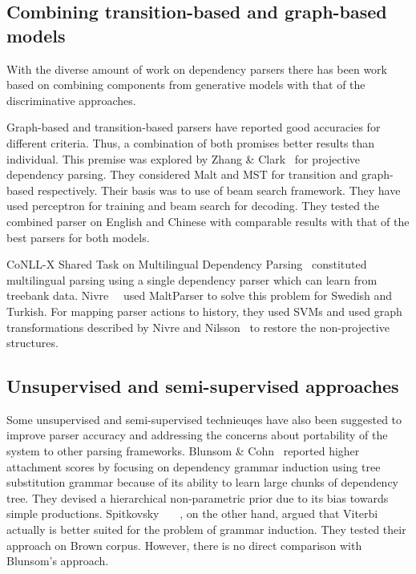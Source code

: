 \subsection{Combining transition-based and graph-based models}


With the diverse amount of work on dependency parsers there has been work based on combining components from generative models with that of the discriminative approaches.

Graph-based and transition-based parsers have reported good accuracies for different criteria. Thus, a combination of both promises better results than individual. This premise was explored by Zhang \& Clark~\cite{zhang2008tale} for projective dependency parsing. They considered Malt and MST for transition and graph-based respectively. Their basis was to use of beam search framework. They have used perceptron for training and beam search for decoding. They tested the combined parser on English and Chinese with comparable results with that of the best parsers for both models.



CoNLL-X Shared Task on Multilingual Dependency Parsing~\cite{Buchholz:2006:CST:1596276.1596305} constituted multilingual parsing using a single dependency parser which can learn from treebank data. Nivre~\etal~\cite{Nivre:2006:LPD:1596276.1596318} used MaltParser to solve this problem for Swedish and Turkish. For mapping parser actions to history, they used SVMs and used graph transformations described by Nivre and Nilsson~\cite{nivre2005pseudo} to restore the non-projective structures.

\subsection{Unsupervised and semi-supervised approaches}




Some unsupervised and semi-supervised technieuqes have also been suggested to improve parser accuracy and addressing the concerns about portability of the system to other parsing frameworks. Blunsom \& Cohn~\cite{blunsom2010unsupervised} reported higher attachment scores by focusing on dependency grammar induction using tree substitution grammar because of its ability to learn large chunks of dependency tree. They devised a hierarchical non-parametric prior due to its bias towards simple productions. Spitkovsky~\etal~
~\cite{spitkovsky2010viterbi}, on the other hand, argued that Viterbi actually is better suited for the problem of grammar induction. They tested their approach on Brown corpus. However, there is no direct comparison with Blunsom's approach.

